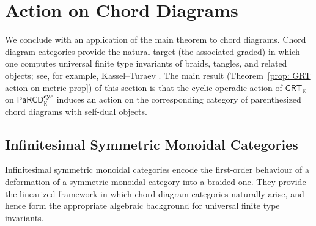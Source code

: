 \documentclass{amsart}
\newcommand{\chandan}[1]{\todo[color=yellow!90!black]{\rm #1 \\ \hfill --- C.}}
\newcommand{\marcy}[1]{\todo[color=magenta!30]{\rm #1 \\ \hfill --- M.}}
\newcommand{\bA}{\mathbf{A}}
\newcommand{\kk}{\mathbb{K}}    %
\newcommand{\PaRCD}{\mathsf{PaRCD}}
\newcommand{\hPaRCD}{{\PaRCD}_{\kk}}
\newcommand{\cyc}{\mathbf{cyc}}
\newcommand{\GRT}{{\mathsf{GRT}}}
\theoremstyle{definition}
\numberwithin{equation}{section}
\begin{document}
\section{Action on Chord Diagrams} \label{sec: Tangles and Chord diagrams}

We conclude with an application of the main theorem to chord diagrams. Chord diagram categories provide the natural target (the associated graded) in which one computes universal finite type invariants of braids, tangles, and related objects; see, for example, Kassel--Turaev \cite{KT_Tangles}. The main result (Theorem~\ref{prop: GRT action on metric prop}) of this section is that the cyclic operadic action of $\GRT_{\kk}$ on $\hPaRCD^{\cyc}$ induces an action on the corresponding category of parenthesized chord diagrams with self-dual objects.


\subsection{Infinitesimal Symmetric Monoidal Categories}
Infinitesimal symmetric monoidal categories encode the first-order behaviour of a deformation of a symmetric monoidal category into a braided one. They provide the linearized framework in which chord diagram categories naturally arise, and hence form the appropriate algebraic background for universal finite type invariants.
\end{document}
